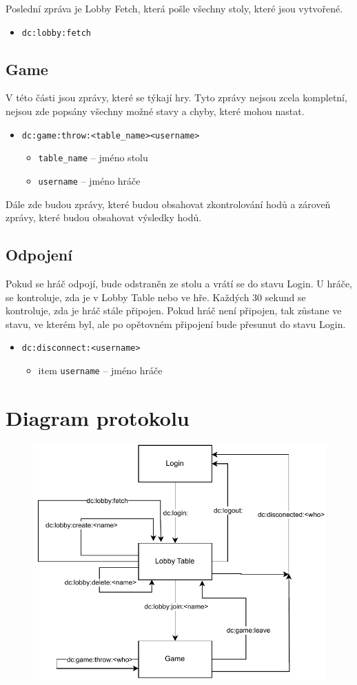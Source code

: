 \documentclass[12pt, a4paper]{article}
\begin{document}
Poslední zpráva je Lobby Fetch, která pošle všechny stoly, které jsou vytvořené.
\begin{itemize}
    \item \texttt{dc:lobby:fetch}
\end{itemize}

\subsection{Game}
V této části jsou zprávy, které se týkají hry.
Tyto zprávy nejsou zcela kompletní, nejsou zde popsány všechny možné stavy a chyby, které mohou nastat.
\begin{itemize}
    \item \texttt{dc:game:throw:<table\_name><username>}
    \begin{itemize}
        \item \texttt{table\_name} -- jméno stolu
        \item \texttt{username} -- jméno hráče
    \end{itemize}
\end{itemize}

Dále zde budou zprávy, které budou obsahovat zkontrolování hodů a zároveň zprávy, které budou obsahovat výsledky hodů.

\subsection{Odpojení}
Pokud se hráč odpojí, bude odstraněn ze stolu a vrátí se do stavu Login.
U hráče, se kontroluje, zda je v Lobby Table nebo ve hře.
Každých 30 sekund se kontroluje, zda je hráč stále připojen.
Pokud hráč není připojen, tak zůstane ve stavu, ve kterém byl, ale po opětovném připojení bude přesunut do stavu Login.
\begin{itemize}
    \item \texttt{dc:disconnect:<username>}
    \begin{itemize}
        \item item \texttt{username} -- jméno hráče
    \end{itemize}
\end{itemize}

\pagebreak
\section{Diagram protokolu}
\begin{figure}[H]
    \centering
    \includegraphics[width=\textwidth]{../protocol_diagram.drawio.pdf}
\end{figure}
\end{document}

